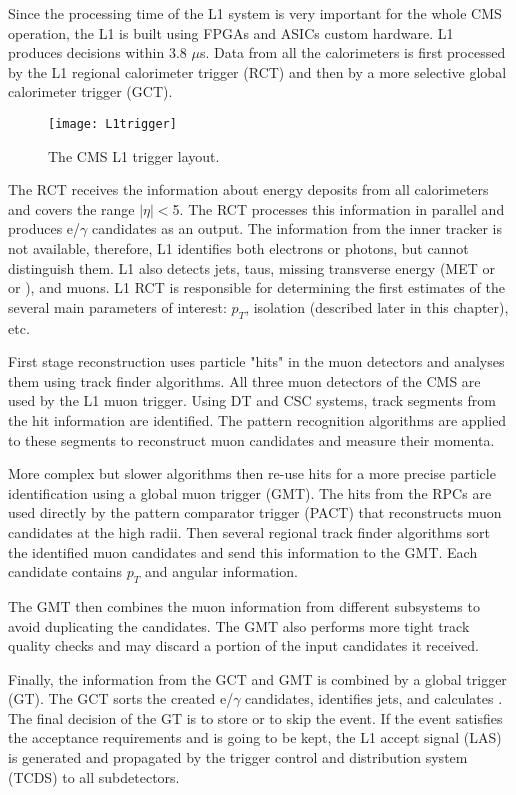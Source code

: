 \begin{normalsize}
Since the processing time of the L1 system is very important for the whole CMS operation, the L1 is built using FPGAs and ASICs custom hardware. L1 produces decisions within 3.8 $\mu$s. Data from all the calorimeters is first processed by the L1 regional calorimeter trigger (RCT) and then by a more selective global calorimeter trigger (GCT). 

 \begin{figure}[H]
  \centering
  \texttt{[image: L1trigger]}
  \caption[The CMS L1 trigger layout]{The CMS L1 trigger layout.}
  \label{L1trigger}
\end{figure}

The RCT receives the information about energy deposits from all calorimeters and covers the range $|\eta|<$5. The RCT processes this information in parallel and produces e/$\gamma$ candidates as an output. The information from the inner tracker is not available, therefore, L1 identifies both electrons or photons, but cannot distinguish them. L1 also detects jets, taus, missing transverse energy (MET or \ETslash or \PTslash), and muons. L1 RCT is responsible for determining the first estimates of the several main parameters of interest: $p_T$, isolation (described later in this chapter), etc. 

First stage reconstruction uses particle "hits" in the muon detectors and analyses them using track finder algorithms. All three muon detectors of the CMS are used by the L1 muon trigger. Using DT and CSC systems, track segments from the hit information are identified. The pattern recognition algorithms are applied to these segments to reconstruct muon candidates and measure their momenta. 

More complex but slower algorithms then re-use hits for a more precise particle identification using a global muon trigger (GMT). 
The hits from the RPCs are used directly by the pattern comparator trigger (PACT) that reconstructs muon candidates at the high radii. Then several regional track finder algorithms sort the identified muon candidates and send this information to the GMT. Each candidate contains $p_T$ and angular information. 

The GMT then combines the muon information from different subsystems to avoid duplicating the candidates. The GMT also performs more tight track quality checks and may discard a portion of the input candidates it received. 

Finally, the information from the GCT and GMT is combined by a global trigger (GT). The GCT sorts the created e/$\gamma$ candidates, identifies jets, and calculates \ETslash. The final decision of the GT is to store or to skip the event. If the event satisfies the acceptance requirements and is going to be kept, the L1 accept signal (LAS) is generated and propagated by the trigger control and distribution system (TCDS) to all subdetectors. 



\end{normalsize}
